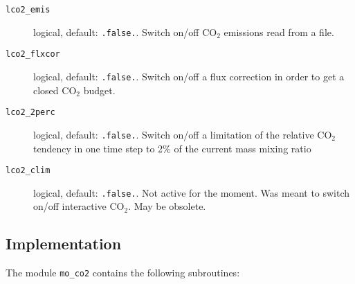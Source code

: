 \begin{appendix}
\begin{description}
\item[{\tt lco2\_emis}] logical, default: {\tt .false.}. Switch on/off
  CO$_2$ emissions read from a file.
\item[{\tt lco2\_flxcor}] logical, default: {\tt .false.}. Switch
  on/off a flux correction in order to get a closed CO$_2$ budget.
\item[{\tt lco2\_2perc}] logical, default: {\tt .false.}. Switch
  on/off a limitation of the relative CO$_2$ tendency in one time step
  to 2\% of the current mass mixing ratio
\item[{\tt lco2\_clim}] logical, default: {\tt .false.}. Not active
  for the moment. Was meant to switch on/off interactive CO$_2$. May
  be obsolete.
\end{description}

\subsection{Implementation}

The module {\tt mo\_co2} contains the following subroutines:


\end{appendix}
